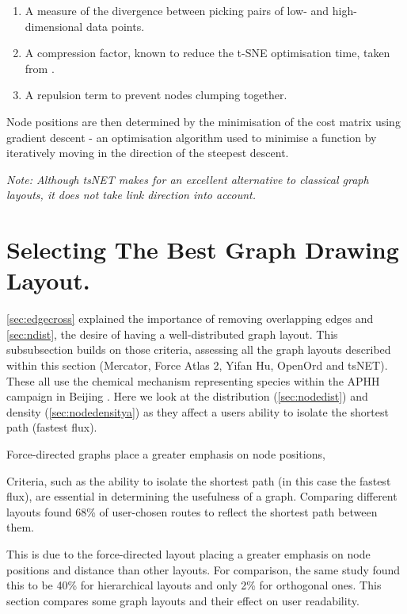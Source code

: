 \begin{enumerate}
    \item A measure of the divergence between picking pairs of low- and high-dimensional data points.
    \item A compression factor, known to reduce the t-SNE optimisation time, taken from \citep{tsnetcompression}.
    \item A repulsion term to prevent nodes clumping together.
\end{enumerate}
    
Node positions are then determined by the minimisation of the cost matrix using gradient descent - an optimisation algorithm used to minimise a function by iteratively moving in the direction of the steepest descent. 

\textit{Note: Although tsNET makes for an excellent alternative to classical graph layouts, it does not take link direction into account. }



\section{Selecting The Best Graph Drawing Layout.}

\autoref{sec:edgecross} explained the importance of removing overlapping edges and \autoref{sec:ndist}, the desire of having a well-distributed graph layout. This subsubsection builds on those criteria, assessing all the graph layouts described within this section (Mercator, Force Atlas 2, Yifan Hu, OpenOrd and tsNET). These all use the chemical mechanism representing species within the APHH campaign in Beijing \citep{aphh}. Here we look at the distribution (\autoref{sec:nodedist}) and density (\autoref{sec:nodedensitya}) as they affect a users ability to isolate the shortest path (fastest flux).

 Force-directed graphs place a greater emphasis on node positions,





Criteria, such as the ability to isolate the shortest path (in this case the fastest flux), are essential in determining the usefulness of a graph. Comparing different layouts \citep{eyetrack} found 68\% of user-chosen routes to reflect the shortest path between them. 

This is due to the force-directed layout placing a greater emphasis on node positions and distance than other layouts. For comparison, the same study found this to be 40\% for hierarchical layouts and only 2\% for orthogonal ones. This section compares some graph layouts and their effect on user readability.


